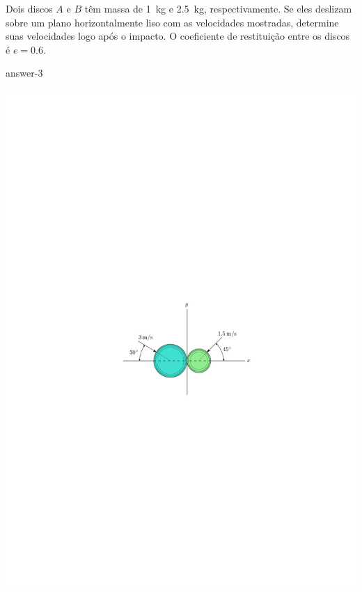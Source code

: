 \item Dois discos $A$ e $B$ têm massa de \SI{1}{\kilogram} e \SI{2.5}{\kilogram}, respectivamente. Se eles deslizam sobre um plano horizontalmente liso com as velocidades mostradas, determine suas velocidades logo após o impacto.
O coeficiente de restituição entre os discos é $e=0.6$.

{answer-3}

\vspace{-1.8cm}
\begin{flushright}
	\includegraphics[scale=1.3]{images/draw_3}
\end{flushright}
\vspace{-1cm}